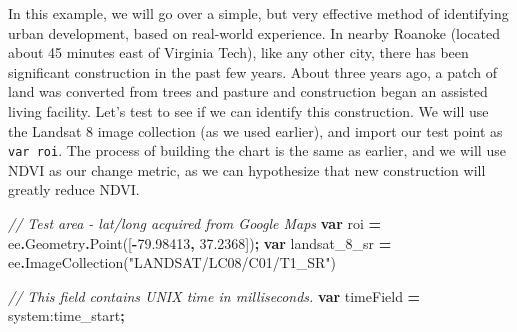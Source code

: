 \documentclass[
]{article}
\newenvironment{Shaded}{\begin{snugshade}}{\end{snugshade}}
\newcommand{\AttributeTok}[1]{\textcolor[rgb]{0.77,0.63,0.00}{#1}}
\newcommand{\CommentTok}[1]{\textcolor[rgb]{0.56,0.35,0.01}{\textit{#1}}}
\newcommand{\FloatTok}[1]{\textcolor[rgb]{0.00,0.00,0.81}{#1}}
\newcommand{\FunctionTok}[1]{\textcolor[rgb]{0.00,0.00,0.00}{#1}}
\newcommand{\KeywordTok}[1]{\textcolor[rgb]{0.13,0.29,0.53}{\textbf{#1}}}
\newcommand{\NormalTok}[1]{#1}
\newcommand{\OperatorTok}[1]{\textcolor[rgb]{0.81,0.36,0.00}{\textbf{#1}}}
\newcommand{\StringTok}[1]{\textcolor[rgb]{0.31,0.60,0.02}{#1}}
\begin{document}
In this example, we will go over a simple, but very effective method of identifying urban development, based on real-world experience. In nearby Roanoke (located about 45 minutes east of Virginia Tech), like any other city, there has been significant construction in the past few years. About three years ago, a patch of land was converted from trees and pasture and construction began an assisted living facility. Let's test to see if we can identify this construction. We will use the Landsat 8 image collection (as we used earlier), and import our test point as \texttt{var\ roi}. The process of building the chart is the same as earlier, and we will use NDVI as our change metric, as we can hypothesize that new construction will greatly reduce NDVI.

\begin{Shaded}
\begin{Highlighting}[]
\CommentTok{// Test area {-} lat/long acquired from Google Maps}
\KeywordTok{var}\NormalTok{ roi }\OperatorTok{=}\NormalTok{ ee}\OperatorTok{.}\AttributeTok{Geometry}\OperatorTok{.}\FunctionTok{Point}\NormalTok{([}\OperatorTok{{-}}\FloatTok{79.98413}\OperatorTok{,} \FloatTok{37.2368}\NormalTok{])}\OperatorTok{;}
\KeywordTok{var}\NormalTok{ landsat\_8\_sr }\OperatorTok{=}\NormalTok{ ee}\OperatorTok{.}\FunctionTok{ImageCollection}\NormalTok{(}\StringTok{"LANDSAT/LC08/C01/T1\_SR"}\NormalTok{)}

\CommentTok{// This field contains UNIX time in milliseconds.}
\KeywordTok{var}\NormalTok{ timeField }\OperatorTok{=} \StringTok{\textquotesingle{}system:time\_start\textquotesingle{}}\OperatorTok{;}


\end{Highlighting}
\end{Shaded}
\end{document}
